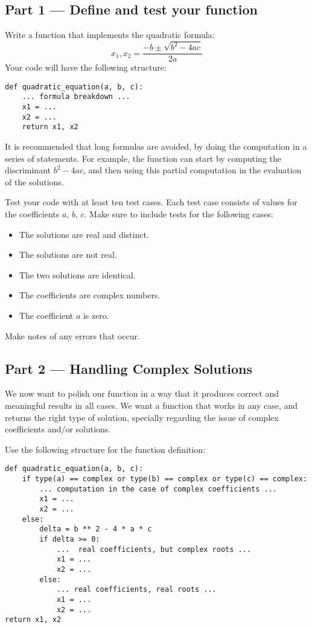 \documentclass[12pt]{article}
\begin{document}
\subsection{Part 1 --- Define and test your function}
Write a function that implements the quadratic formula:
\[
x_1,x_2=\frac{-b\pm \sqrt{b^2-4ac}}{2a}
\]
Your code will have the following structure:

\begin{lstlisting}
def quadratic_equation(a, b, c):
    ... formula breakdown ...
    x1 = ...
    x2 = ...
    return x1, x2
\end{lstlisting}

It is recommended that long formulas are avoided, by doing the computation in a series of statements. For example, the function can start by computing the discriminant $b^2-4ac$, and then using this partial computation in the evaluation of the solutions.

Test your code with at least ten test cases. Each test case consists of values for the coefficients $a$, $b$, $c$. Make sure to include tests for the following cases:

\begin{itemize}
\item The solutions are real and distinct.
\item The solutions are not real.
\item The two solutions are identical.
\item The coefficients are complex numbers.
\item The coefficient $a$ is zero.
\end{itemize}

Make notes of any errors that occur.

\subsection{Part 2 --- Handling Complex Solutions}

We now want to polish our function in a way that it produces correct and meaningful results in all cases. We want a function that works in any case, and returns the right type of solution, specially regarding the issue of complex coefficients and/or solutions.

Use the following structure for the function definition:

\begin{lstlisting}
def quadratic_equation(a, b, c):
    if type(a) == complex or type(b) == complex or type(c) == complex:
        ... computation in the case of complex coefficients ...
        x1 = ...
        x2 = ...
    else:
        delta = b ** 2 - 4 * a * c
        if delta >= 0:
            ...  real coefficients, but complex roots ...
            x1 = ...
            x2 = ...
        else:
            ... real coefficients, real roots ...
            x1 = ...
            x2 = ...
return x1, x2
\end{lstlisting}
\end{document}

